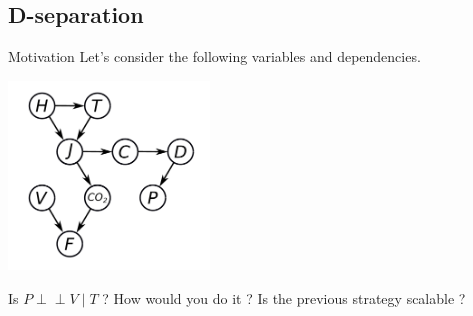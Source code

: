 \documentclass{beamer}
\newcommand{\indep}{\perp\!\!\!\perp}
\begin{document}
%  
% 
% 
% 

\subsection{D-separation}


\begin{frame}{Motivation}
Let's consider the following variables and dependencies.
\begin{center}
\includegraphics[width=0.4\textwidth]{fig/huge-muvar.pdf}
\end{center}
Is $P \indep V \;|\; T$ ? How would you do it ? Is the previous strategy scalable ?
\end{frame}
\end{document}
